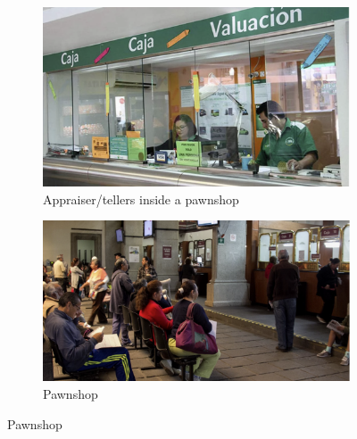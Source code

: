 \begin{figure}[H]
     \caption{Some Pawnshops}
    \label{PawnshopPicture}
    \begin{center}
    \begin{subfigure}{0.42\textwidth}
    \caption{Appraiser/tellers inside a pawnshop}
        \centering
        \includegraphics[width=\textwidth]{Figuras/empenio9.png}
    \end{subfigure}
        \begin{subfigure}{0.45\textwidth}
    \caption{Pawnshop}
        \centering
        \includegraphics[width=\textwidth]{Figuras/empenio11.png}
    \end{subfigure}
    
        \vspace{3ex}


\end{center}
\end{figure}
